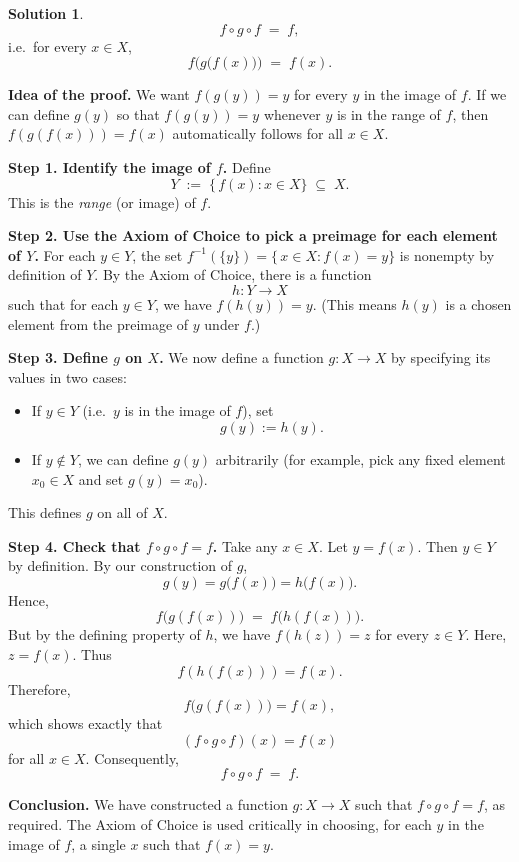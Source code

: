 \documentclass[12pt]{article}
\theoremstyle{definition} %
\newtheorem{solution}{Solution}
\theoremstyle{plain} %
\begin{document}
\begin{solution}

\[
   f \circ g \circ f \;=\; f,
\]
i.e.\ for every $x \in X$,
\[
   f\bigl(g\bigl(f(x)\bigr)\bigr) \;=\; f(x).
\]

\medskip

\textbf{Idea of the proof.} 
We want $f(g(y)) = y$ for every $y$ in the image of $f$. If we can define $g(y)$ so that $f(g(y)) = y$ whenever $y$ is in the range of $f$, then $f(g(f(x))) = f(x)$ automatically follows for all $x \in X$. 

\medskip

\textbf{Step 1. Identify the image of $f$.} 
Define
\[
   Y \;:=\; \{\, f(x) : x \in X \} \;\subseteq\; X.
\]
This is the \emph{range} (or image) of $f$.

\medskip

\textbf{Step 2. Use the Axiom of Choice to pick a preimage for each element of $Y$.} 
For each $y \in Y$, the set $f^{-1}(\{y\}) = \{\, x \in X : f(x) = y \}$ is nonempty by definition of $Y$. By the Axiom of Choice, there is a function 
\[
   h : Y \to X
\]
such that for each $y \in Y$, we have $f(h(y)) = y$. (This means $h(y)$ is a chosen element from the preimage of $y$ under $f$.)

\medskip

\textbf{Step 3. Define $g$ on $X$.} 
We now define a function $g : X \to X$ by specifying its values in two cases:
\begin{itemize}
    \item If $y \in Y$ (i.e.\ $y$ is in the image of $f$), set
    \[
       g(y) := h(y).
    \]
    \item If $y \notin Y$, we can define $g(y)$ arbitrarily (for example, pick any fixed element $x_0 \in X$ and set $g(y) = x_0$). 
\end{itemize}
This defines $g$ on all of $X$.

\medskip

\textbf{Step 4. Check that $f \circ g \circ f = f$.} 
Take any $x \in X$. Let $y = f(x)$. Then $y \in Y$ by definition. By our construction of $g$,
\[
   g(y) = g\bigl(f(x)\bigr) = h\bigl(f(x)\bigr).
\]
Hence,
\[
   f\bigl(g(f(x))\bigr) \;=\; f\bigl(h(f(x))\bigr).
\]
But by the defining property of $h$, we have $f(h(z)) = z$ for every $z \in Y$. Here, $z = f(x)$. Thus
\[
   f(h(f(x))) = f(x).
\]
Therefore,
\[
   f\bigl(g(f(x))\bigr) = f(x),
\]
which shows exactly that
\[
   (f \circ g \circ f)(x) = f(x)
\]
for all $x \in X$. Consequently,
\[
   f \circ g \circ f \;=\; f.
\]

\medskip

\textbf{Conclusion.} We have constructed a function $g: X \to X$ such that $f \circ g \circ f = f$, as required. The Axiom of Choice is used critically in choosing, for each $y$ in the image of $f$, a single $x$ such that $f(x) = y$.

\end{solution}
\end{document}
